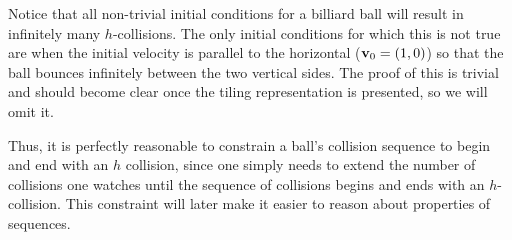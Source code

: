 Notice that all non-trivial initial conditions for a billiard ball will result in infinitely many $h$-collisions. The only initial conditions for which this is not true are when the initial velocity is parallel to the horizontal ($\mathbf{v}_0 = (1, 0)$) so that the ball bounces infinitely between the two vertical sides. The proof of this is trivial and should become clear once the tiling representation is presented, so we will omit it.

Thus, it is perfectly reasonable to constrain a ball's collision sequence to begin and end with an $h$ collision, since one simply needs to extend the number of collisions one watches until the sequence of collisions begins and ends with an $h$-collision. This constraint will later make it easier to reason about properties of sequences.
